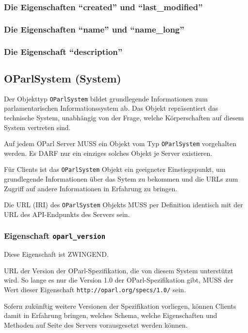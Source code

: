 \documentclass[,a4paper]{article}
\begin{document}
\subsubsection{Die Eigenschaften ``created'' und ``last\_modified''}

\subsubsection{Die Eigenschaften ``name'' und ``name\_long''}

\subsubsection{Die Eigenschaft ``description''}

\subsection{OParlSystem (System)}

Der Objekttyp \texttt{OParlSystem} bildet grundlegende Informationen zum
parlamentarischen Informationssystem ab. Das Objekt repräsentiert das
technische System, unabhängig von der Frage, welche Körperschaften auf
diesem System vertreten sind.

Auf jedem OParl Server MUSS ein Objekt vom Typ \texttt{OParlSystem}
vorgehalten werden. Es DARF nur ein einziges solches Objekt je Server
existieren.

Für Clients ist das \texttt{OParlSystem} Objekt ein geeigneter
Einstiegspunkt, um grundlegende Informationen über das Sytem zu bekommen
und die URLs zum Zugriff auf andere Informationen in Erfahrung zu
bringen.

Die URL (IRI) des \texttt{OParlSystem} Objekts MUSS per Definition
identisch mit der URL des API-Endpunkts des Servers sein.

\subsubsection{Eigenschaft \texttt{oparl\_version}}

Diese Eigenschaft ist ZWINGEND.

URL der Version der OParl-Spezifikation, die von diesem System
unterstützt wird. So lange es nur die Version 1.0 der
OParl-Spezifikation gibt, MUSS der Wert dieser Eigenschaft
\texttt{http://oparl.org/specs/1.0/} sein.

Sofern zukünftig weitere Versionen der Spezifikation vorliegen, können
Clients damit in Erfahrung bringen, welches Schema, welche Eigenschaften
und Methoden auf Seite des Servers vorausgesetzt werden können.
\end{document}
